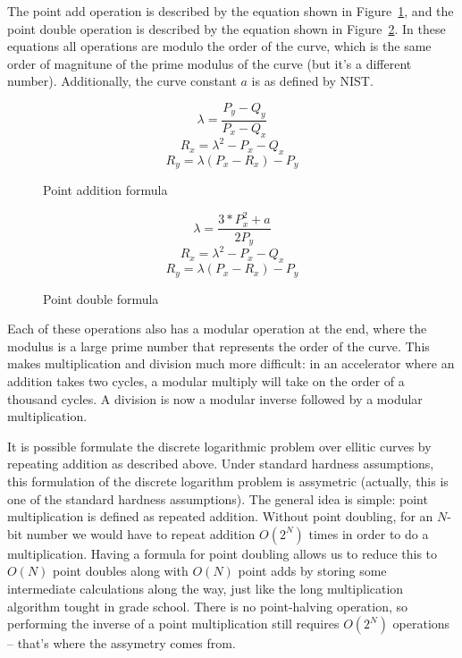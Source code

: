 \documentclass[twocolumn]{article}
\begin{document}
The point add operation is described by the equation shown in
Figure~\ref{point-add-eq}, and the point double operation is described
by the equation shown in Figure~\ref{point-dub-eq}.  In these
equations all operations are modulo the order of the curve, which is
the same order of magnitune of the prime modulus of the curve (but
it's a different number).  Additionally, the curve constant $a$ is as
defined by NIST.

\begin{figure}[ht]
  $$ \lambda = \frac{P_y - Q_y}{P_x - Q_x} $$
  $$ R_x = \lambda^2 - P_x - Q_x $$
  $$ R_y = \lambda(P_x - R_x) - P_y $$

  \caption{Point addition formula
    \label{point-add-eq}}
\end{figure}

\begin{figure}[ht]
  $$ \lambda = \frac{3 * P_x^2 + a}{2P_y} $$
  $$ R_x = \lambda^2 - P_x - Q_x $$
  $$ R_y = \lambda(P_x - R_x) - P_y $$

  \caption{Point double formula
    \label{point-dub-eq}}
\end{figure}

Each of these operations also has a modular operation at the end,
where the modulus is a large prime number that represents the order of
the curve. This makes multiplication and division much more difficult:
in an accelerator where an addition takes two cycles, a modular
multiply will take on the order of a thousand cycles\cite{kss-ecdsa}.
A division is now a modular inverse followed by a modular
multiplication.

It is possible formulate the discrete logarithmic problem over
ellitic curves by repeating addition as described above.  Under
standard hardness assumptions, this formulation of the discrete
logarithm problem is assymetric (actually, this is one of the
standard hardness assumptions).  The general idea is simple: point multiplication is defined as repeated addition.  Without point doubling, for an $N$-bit
number we would have to repeat addition $O(2^N)$ times in order to do
a multiplication.  Having a formula for point doubling allows us to
reduce this to $O(N)$ point doubles along with $O(N)$ point adds by
storing some intermediate calculations along the way, just like the
long multiplication algorithm tought in grade school.  There is no
point-halving operation, so performing the inverse of a point
multiplication still requires $O(2^N)$ operations -- that's where the
assymetry comes from.
\end{document}
